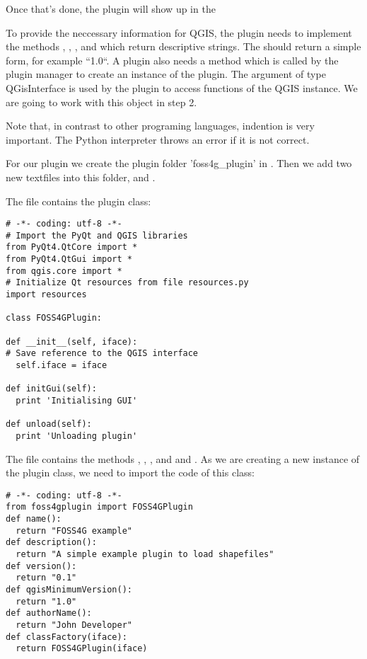 Once that's done, the plugin will show up in the

To provide the neccessary information for QGIS, the plugin needs to implement
the methods , , ,
 and  which return descriptive strings.
The  should return a simple form, for example ``1.0``. A plugin also needs a method
 which is called by the plugin manager to create
an instance of the plugin. The argument of type QGisInterface is used by the
plugin to access functions of the QGIS instance. We are going to work with
this object in step 2.  

Note that, in contrast to other programing languages, indention is very
important. The Python interpreter throws an error if it is not correct.

For our plugin we create the plugin folder 'foss4g\_plugin' in
. Then we add two new textfiles into this
folder,  and .

The file  contains the plugin class:

\begin{verbatim}
# -*- coding: utf-8 -*-
# Import the PyQt and QGIS libraries
from PyQt4.QtCore import *
from PyQt4.QtGui import *
from qgis.core import *
# Initialize Qt resources from file resources.py
import resources

class FOSS4GPlugin:

def __init__(self, iface):
# Save reference to the QGIS interface
  self.iface = iface

def initGui(self):
  print 'Initialising GUI'

def unload(self):
  print 'Unloading plugin'
\end{verbatim}

The file  contains the methods ,
, , 
and  and . As
we are creating a new instance of the plugin class, we need to import the
code of this class:

\begin{verbatim}
# -*- coding: utf-8 -*-
from foss4gplugin import FOSS4GPlugin
def name():
  return "FOSS4G example"
def description():
  return "A simple example plugin to load shapefiles"
def version():
  return "0.1"
def qgisMinimumVersion():
  return "1.0"
def authorName():
  return "John Developer"
def classFactory(iface):
  return FOSS4GPlugin(iface)
\end{verbatim}

